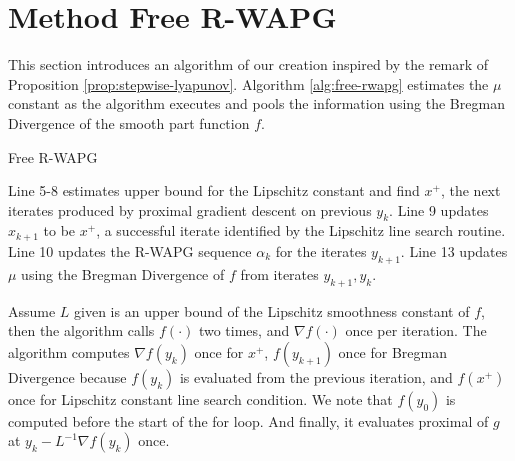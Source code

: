 \documentclass[12pt]{article}
\begin{document}
\section{Method Free R-WAPG}\label{sec:spectral-momentum}
    This section introduces an algorithm of our creation inspired by the remark of Proposition \ref{prop:stepwise-lyapunov}. 
    Algorithm \ref{alg:free-rwapg} estimates the $\mu$ constant as the algorithm executes and pools the information using the Bregman Divergence of the smooth part function $f$. 
    \begin{algorithm}
        \begin{algorithmic}[1]
        {\footnotesize
            \ENDWHILE
        \ENDFOR
        }
        \end{algorithmic}
        \caption{Free R-WAPG}
        \label{alg:free-rwapg}
    \end{algorithm}
    \par
    Line 5-8 estimates upper bound for the Lipschitz constant and find $x^+$, the next iterates produced by proximal gradient descent on previous $y_k$.
    Line 9 updates $x_{k + 1}$ to be $x^+$, a successful iterate identified by the Lipschitz line search routine. 
    Line 10 updates the R-WAPG sequence $\alpha_k$ for the iterates $y_{k + 1}$. 
    Line 13 updates $\mu$ using the Bregman Divergence of $f$ from iterates $y_{k + 1}, y_k$. 
    \par
    Assume $L$ given is an upper bound of the Lipschitz smoothness constant of $f$, then the algorithm calls $f(\cdot)$ two times, and $\nabla f(\cdot)$ once per iteration. 
    The algorithm computes $\nabla f(y_k)$ once for $x^+$, $f(y_{k + 1})$ once for Bregman Divergence because $f(y_{k})$ is evaluated from the previous iteration, and $f(x^+)$ once for Lipschitz constant line search condition. 
    We note that $f(y_0)$ is computed before the start of the for loop. 
    And finally, it evaluates proximal of $g$ at $y_k - L^{-1}\nabla f(y_k)$ once. 
\end{document}
